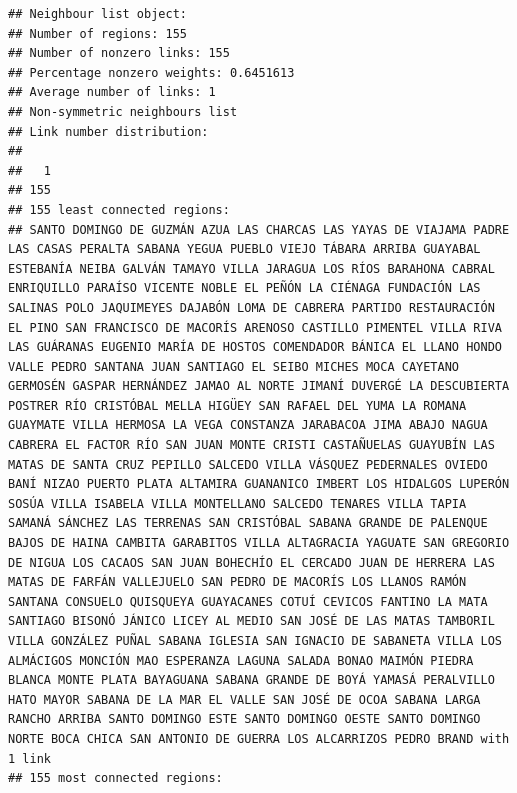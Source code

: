 \documentclass[11pt,]{article}
\begin{document}
\begin{verbatim}
## Neighbour list object:
## Number of regions: 155 
## Number of nonzero links: 155 
## Percentage nonzero weights: 0.6451613 
## Average number of links: 1 
## Non-symmetric neighbours list
## Link number distribution:
## 
##   1 
## 155 
## 155 least connected regions:
## SANTO DOMINGO DE GUZMÁN AZUA LAS CHARCAS LAS YAYAS DE VIAJAMA PADRE LAS CASAS PERALTA SABANA YEGUA PUEBLO VIEJO TÁBARA ARRIBA GUAYABAL ESTEBANÍA NEIBA GALVÁN TAMAYO VILLA JARAGUA LOS RÍOS BARAHONA CABRAL ENRIQUILLO PARAÍSO VICENTE NOBLE EL PEÑÓN LA CIÉNAGA FUNDACIÓN LAS SALINAS POLO JAQUIMEYES DAJABÓN LOMA DE CABRERA PARTIDO RESTAURACIÓN EL PINO SAN FRANCISCO DE MACORÍS ARENOSO CASTILLO PIMENTEL VILLA RIVA LAS GUÁRANAS EUGENIO MARÍA DE HOSTOS COMENDADOR BÁNICA EL LLANO HONDO VALLE PEDRO SANTANA JUAN SANTIAGO EL SEIBO MICHES MOCA CAYETANO GERMOSÉN GASPAR HERNÁNDEZ JAMAO AL NORTE JIMANÍ DUVERGÉ LA DESCUBIERTA POSTRER RÍO CRISTÓBAL MELLA HIGÜEY SAN RAFAEL DEL YUMA LA ROMANA GUAYMATE VILLA HERMOSA LA VEGA CONSTANZA JARABACOA JIMA ABAJO NAGUA CABRERA EL FACTOR RÍO SAN JUAN MONTE CRISTI CASTAÑUELAS GUAYUBÍN LAS MATAS DE SANTA CRUZ PEPILLO SALCEDO VILLA VÁSQUEZ PEDERNALES OVIEDO BANÍ NIZAO PUERTO PLATA ALTAMIRA GUANANICO IMBERT LOS HIDALGOS LUPERÓN SOSÚA VILLA ISABELA VILLA MONTELLANO SALCEDO TENARES VILLA TAPIA SAMANÁ SÁNCHEZ LAS TERRENAS SAN CRISTÓBAL SABANA GRANDE DE PALENQUE BAJOS DE HAINA CAMBITA GARABITOS VILLA ALTAGRACIA YAGUATE SAN GREGORIO DE NIGUA LOS CACAOS SAN JUAN BOHECHÍO EL CERCADO JUAN DE HERRERA LAS MATAS DE FARFÁN VALLEJUELO SAN PEDRO DE MACORÍS LOS LLANOS RAMÓN SANTANA CONSUELO QUISQUEYA GUAYACANES COTUÍ CEVICOS FANTINO LA MATA SANTIAGO BISONÓ JÁNICO LICEY AL MEDIO SAN JOSÉ DE LAS MATAS TAMBORIL VILLA GONZÁLEZ PUÑAL SABANA IGLESIA SAN IGNACIO DE SABANETA VILLA LOS ALMÁCIGOS MONCIÓN MAO ESPERANZA LAGUNA SALADA BONAO MAIMÓN PIEDRA BLANCA MONTE PLATA BAYAGUANA SABANA GRANDE DE BOYÁ YAMASÁ PERALVILLO HATO MAYOR SABANA DE LA MAR EL VALLE SAN JOSÉ DE OCOA SABANA LARGA RANCHO ARRIBA SANTO DOMINGO ESTE SANTO DOMINGO OESTE SANTO DOMINGO NORTE BOCA CHICA SAN ANTONIO DE GUERRA LOS ALCARRIZOS PEDRO BRAND with 1 link
## 155 most connected regions:

\end{verbatim}
\end{document}

